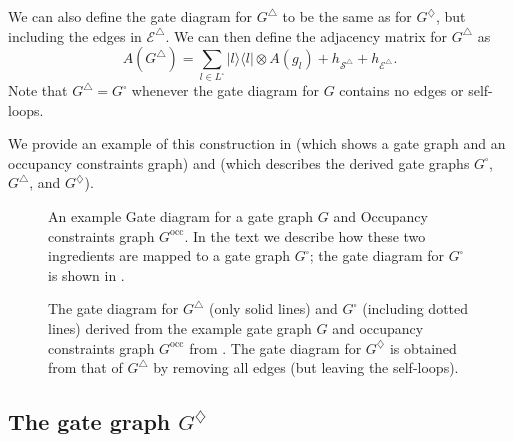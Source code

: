 \documentclass[../thesis-main/thesis-main]{subfiles}
\begin{document}
We can also define the gate diagram for $G^{\triangle}$ to be the same as for $G^{\diamondsuit}$, but including the edges in $\mathcal{E}^{\triangle}$.  We can then define the adjacency matrix for $G^{\triangle}$ as
\begin{equation}
  A(G^{\triangle})=\sum_{l\in L^{\square}}|l\rangle\langle l|\otimes A(g_{l})+h_{\mathcal{S}^{\triangle}}+h_{\mathcal{E}^{\triangle}}.\label{eq:A_g_triangle}
\end{equation}
Note that $G^{\triangle}=G^{\square}$ whenever the gate diagram for $G$ contains no edges or self-loops. 


We provide an example of this construction in  (which shows a gate graph and an occupancy constraints graph) and  (which describes the derived gate graphs $G^{\square}$, $G^{\triangle}$, and $G^{\diamondsuit}$).


\begin{figure}
\hspace{4cm}
\caption{An example  Gate diagram for a gate graph $G$ and  Occupancy constraints graph $G^{\text{occ}}$. In the text we describe how these two ingredients are mapped to a gate graph $G^{\square}$; the gate diagram for $G^{\square}$ is shown in .\label{fig:example_G_Gtilde}}
\end{figure}

\begin{figure}
  
\caption{The gate diagram for $G^{\triangle}$ (only solid lines) and $G^{\square}$ (including dotted lines) derived from the example gate graph $G$ and occupancy constraints graph $G^{\text{occ}}$ from . The gate diagram for $G^{\diamondsuit}$ is obtained from that of $G^{\triangle}$ by removing all edges (but leaving the self-loops).\label{fig:big_example_G_square}}
\end{figure}


\subsection{The gate graph $G^{\diamondsuit}$}
\label{sec:The-gate-graph_G_DIAMOND}
\end{document}
